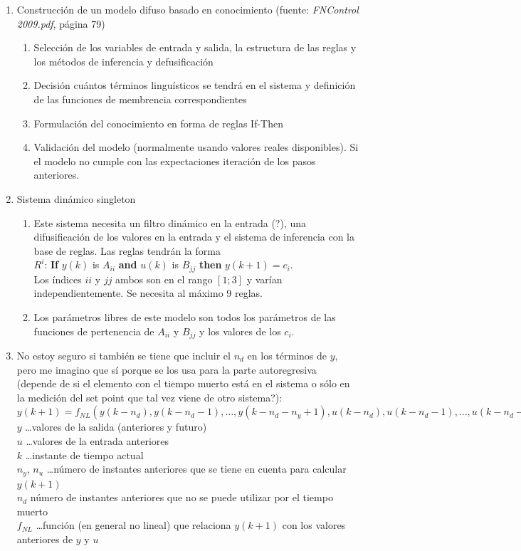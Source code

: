 \documentclass[10pt,onecolumn,twoside,letterpaper]{article}
\begin{document}
\begin{enumerate}
\item Construcción de un modelo difuso basado en conocimiento (fuente: \textit{FNControl 2009.pdf}, página 79)\\
  \begin{enumerate}
  \item Selección de los variables de entrada y salida, la estructura de las reglas y los métodos de inferencia y defusificación
  \item Decisión cuántos términos linguísticos se tendrá en el sistema y definición de las funciones de membrencia correspondientes
  \item Formulación del conocimiento en forma de reglas If-Then
  \item Validación del modelo (normalmente usando valores reales disponibles). Si el modelo no cumple con las expectaciones iteración de los pasos anteriores.
  \end{enumerate}

\item Sistema dinámico singleton
  \begin{enumerate}
  \item Este sistema necesita un filtro dinámico en la entrada (?), una difusificación de los valores en la entrada y el sistema de inferencia con la base de reglas. Las reglas tendrán la forma\\
    $R^{i}$: \textbf{If} $y(k)$ is $A_{ii}$ \textbf{and} $u(k)$ is $B_{jj}$ \textbf{then} $y(k+1)=c_i$.\\Los índices $ii$ y $jj$ ambos son en el rango $[1;3]$ y varían independientemente. Se necesita al máximo 9 reglas.

  \item Los parámetros libres de este modelo son todos los parámetros de las funciones de pertenencia de $A_{ii}$ y $B_{jj}$ y los valores de los $c_i$.
  \end{enumerate}

\item No estoy seguro si también se tiene que incluir el $n_d$ en los términos de $y$, pero me imagino que sí porque se los usa para la parte autoregresiva (depende de si el elemento con el tiempo muerto está en el sistema o sólo en la medición del set point que tal vez viene de otro sistema?):\\ $y(k+1)=f_{NL}(y(k-n_d),y(k-n_d-1),\dots,y(k-n_d-n_y+1),u(k-n_d),u(k-n_d-1),\dots,u(k-n_d-n_u+1))$\\
  $y$ \dots valores de la salida (anteriores y futuro)\\
  $u$ \dots valores de la entrada anteriores\\
  $k$ \dots instante de tiempo actual\\
  $n_y$, $n_u$ \dots número de instantes anteriores que se tiene en cuenta para calcular $y(k+1)$\\
  $n_d$ número de instantes anteriores que no se puede utilizar por el tiempo muerto\\
  $f_{NL}$ \dots función (en general no lineal) que relaciona $y(k+1)$ con los valores anteriores de $y$ y $u$


\end{enumerate}
\end{document}
